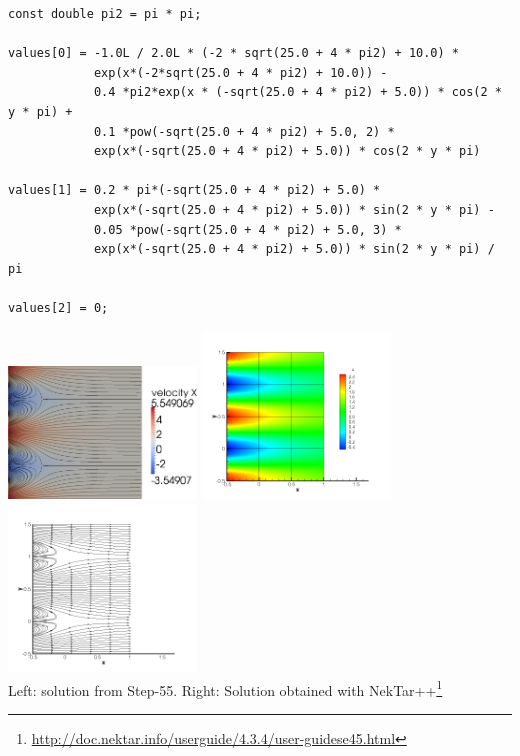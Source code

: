 \begin{lstlisting}
const double pi2 = pi * pi;

values[0] = -1.0L / 2.0L * (-2 * sqrt(25.0 + 4 * pi2) + 10.0) *
            exp(x*(-2*sqrt(25.0 + 4 * pi2) + 10.0)) -
            0.4 *pi2*exp(x * (-sqrt(25.0 + 4 * pi2) + 5.0)) * cos(2 * y * pi) +
            0.1 *pow(-sqrt(25.0 + 4 * pi2) + 5.0, 2) *
            exp(x*(-sqrt(25.0 + 4 * pi2) + 5.0)) * cos(2 * y * pi)

values[1] = 0.2 * pi*(-sqrt(25.0 + 4 * pi2) + 5.0) *
            exp(x*(-sqrt(25.0 + 4 * pi2) + 5.0)) * sin(2 * y * pi) -
            0.05 *pow(-sqrt(25.0 + 4 * pi2) + 5.0, 3) *
            exp(x*(-sqrt(25.0 + 4 * pi2) + 5.0)) * sin(2 * y * pi) / pi

values[2] = 0;
\end{lstlisting}

\begin{center}
\includegraphics[width=5cm]{images/mms/kovasznay/step-55_solution}
\includegraphics[width=5cm]{images/mms/kovasznay/KF2DCVP8}
\includegraphics[width=5cm]{images/mms/kovasznay/KF2DCVP8SL}\\
{\captionfont 
Left: solution from Step-55. Right:
Solution obtained with 
NekTar++\footnote{\url{http://doc.nektar.info/userguide/4.3.4/user-guidese45.html}}}
\end{center}


